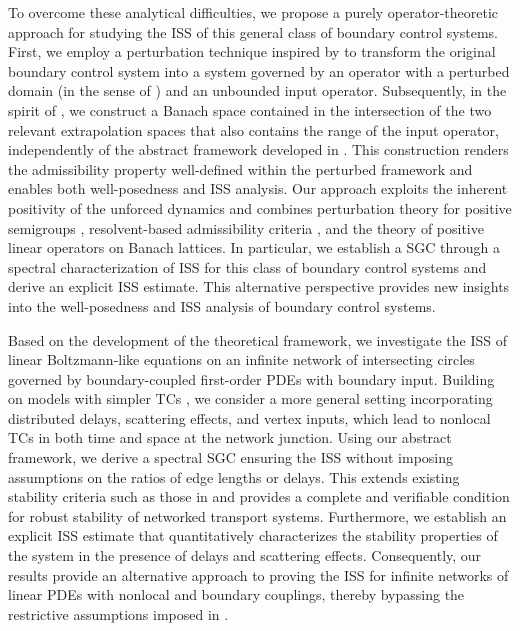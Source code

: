 \documentclass[onecolumn]{autart}
\numberwithin{equation}{section}
\begin{document}
     To overcome these analytical difficulties, we propose a purely operator-theoretic approach for studying the ISS of this general class of boundary control systems. First, we employ a perturbation technique inspired by \cite{Gr,Salam} to transform the original boundary control system into a system governed by an operator with a perturbed domain (in the sense of \cite{Gr}) and an unbounded input operator. Subsequently, in the spirit of \cite{WF}, we construct a Banach space contained in the intersection of the two relevant extrapolation spaces that also contains the range of the input operator, independently of the abstract framework developed in \cite{Staffans,WF,WT}. This construction renders the admissibility property well-defined within the perturbed framework and enables both well-posedness and ISS analysis. Our approach exploits the inherent positivity of the unforced  dynamics and combines perturbation theory for positive semigroups \cite{El1}, resolvent-based admissibility criteria \cite{ELLC}, and the theory of positive linear operators on Banach lattices. In particular, we establish a SGC through a spectral characterization of ISS for this class of boundary control systems and derive an explicit ISS estimate. This alternative perspective provides new insights into the well-posedness and ISS analysis of boundary control systems.

   {Based on} the development of the theoretical framework, we investigate the ISS of linear Boltzmann-like equations on an infinite network of intersecting circles governed by boundary-coupled first-order PDEs with boundary input. Building on models with simpler TCs \cite{YGS}, we consider a more general setting incorporating distributed delays, scattering effects, and vertex inputs, which lead to nonlocal TCs in both time and space at the network junction. Using our abstract framework, we derive a spectral SGC ensuring the ISS without imposing assumptions on the ratios of edge lengths or delays. This extends existing stability criteria such as those in \cite{YGS} and provides a complete and verifiable condition for robust stability {of} networked transport systems. Furthermore, we establish an explicit ISS estimate that quantitatively characterizes the stability properties of the system in the presence of delays and scattering effects. Consequently, our results provide an alternative approach to proving the ISS for infinite networks of linear PDEs with nonlocal and boundary couplings, thereby bypassing the restrictive assumptions imposed in \cite{MKG}.
\end{document}
